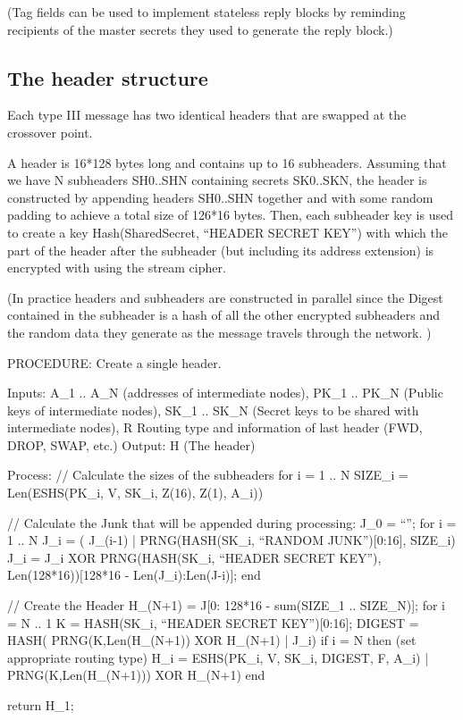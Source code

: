 (Tag fields can be used to  implement stateless reply blocks by
reminding recipients of the master secrets they used to generate the
reply block.)

\subsection{The header structure}

Each type III message has two identical headers that are swapped at
the crossover point.

A header is 16*128 bytes long and contains up to 16
subheaders. Assuming that we have N subheaders SH0..SHN containing
secrets SK0..SKN, the header is constructed by appending headers
SH0..SHN together and with some random padding to achieve a total size
of 126*16 bytes. Then, each subheader key is used to create a key
Hash(SharedSecret, ``HEADER SECRET KEY'') with which the part of the
header after the subheader (but including its address extension) is
encrypted with using the stream cipher. 

(In practice headers and subheaders are constructed in parallel since
the Digest contained in the subheader is a hash of all the other
encrypted subheaders and the random data they generate as the message
travels through the network. )

PROCEDURE: Create a single header.

Inputs: A_1 .. A_N (addresses of intermediate nodes), 
	PK_1 .. PK_N (Public keys of intermediate nodes),
	SK_1 .. SK_N (Secret keys to be shared with intermediate nodes),
        R Routing type and information of last header (FWD, DROP, SWAP, etc.)
Output: H (The header)

Process: 
  // Calculate the sizes of the subheaders
  for i = 1 .. N
	SIZE_i = Len(ESHS(PK_i, V, SK_i, Z(16), Z(1), A_i))

  // Calculate the Junk that will be appended during processing:
  J_0 = ``'';
  for i = 1 .. N
	J_i = ( J_(i-1) | PRNG(HASH(SK_i, ``RANDOM JUNK'')[0:16], SIZE_i)
	J_i = J_i XOR PRNG(HASH(SK_i, ``HEADER SECRET KEY''),
  		Len(128*16))[128*16 - Len(J_i):Len(J-i)];
  end

  // Create the Header
  H_(N+1) = J[0: 128*16 - sum(SIZE_1 .. SIZE_N)];
  for i = N .. 1
	K = HASH(SK_i, ``HEADER SECRET KEY'')[0:16];
  	DIGEST = HASH( PRNG(K,Len(H_(N+1)) XOR H_(N+1) | J_i)
	if i = N then (set appropriate routing type)
	H_i = ESHS(PK_i, V, SK_i, DIGEST, F, A_i) | PRNG(K,Len(H_(N+1))) XOR H_(N+1)
  end

return H_1;

